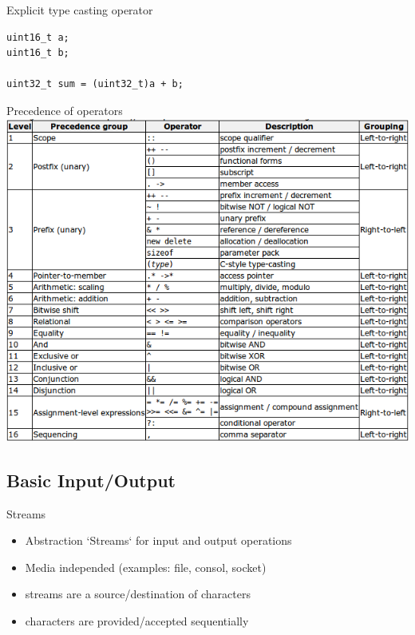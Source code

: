 \documentclass{beamer}
\begin{document}
\begin{frame}[fragile]{Explicit type casting operator}
\begin{lstlisting}[caption=Type cast]
uint16_t a;
uint16_t b;

uint32_t sum = (uint32_t)a + b;
\end{lstlisting}
\end{frame}

\begin{frame}{Precedence of operators}
\includegraphics[scale=0.48]{img/OperatorPrecedence.png}
\end{frame}


\subsection{Basic Input/Output}

\begin{frame}{Streams}
\begin{itemize}
\item Abstraction `Streams` for input and output operations
\item Media independed (examples: file, consol, socket)
\item streams are a source/destination of characters
\item characters are provided/accepted sequentially
\end{itemize}
\end{frame}
\end{document}
